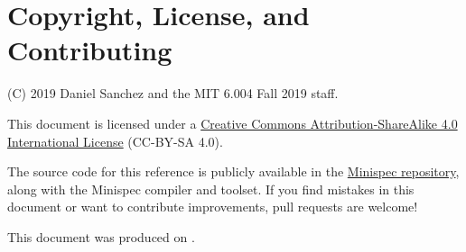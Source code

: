 \section{Copyright, License, and Contributing}

(C) 2019 Daniel Sanchez and the MIT 6.004 Fall 2019 staff.

This document is licensed under a \href{http://creativecommons.org/licenses/by-sa/4.0/}{Creative Commons Attribution-ShareAlike 4.0 International License} (CC-BY-SA 4.0).

The source code for this reference is publicly available in the \href{https://github.com/minispec-hdl/minispec/}{Minispec repository},
along with the Minispec compiler and toolset.
If you find mistakes in this document or want to contribute improvements, pull requests are welcome!

This document was produced on .

